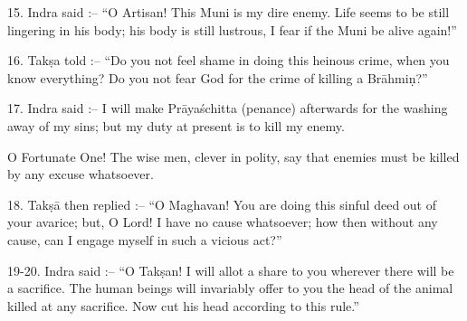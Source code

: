 15. Indra said :-- ``O Artisan! This Muni is my dire enemy. Life seems to be still lingering in his body; his body is still lustrous, I fear if the Muni be alive again!''

16. Tak\d{s}a told :-- ``Do you not feel shame in doing this heinous crime, when you know everything? Do you not fear God for the crime of killing a Br\=ahmi\d{n}?''

17. Indra said :-- I will make Pr\=aya\'schitta (penance) afterwards for the washing away of my sins; but my duty at present is to kill my enemy.

O Fortunate One! The wise men, clever in polity, say that enemies must be killed by any excuse whatsoever.

18. Tak\d{s}\=a then replied :-- ``O Maghavan! You are doing this sinful deed out of your avarice; but, O Lord! I have no cause whatsoever; how then without any cause, can I engage myself in such a vicious act?''

19-20. Indra said :-- ``O Tak\d{s}an! I will allot a share to you wherever there will be a sacrifice. The human beings will invariably offer to you the head of the animal killed at any sacrifice. Now cut his head according to this rule.''

